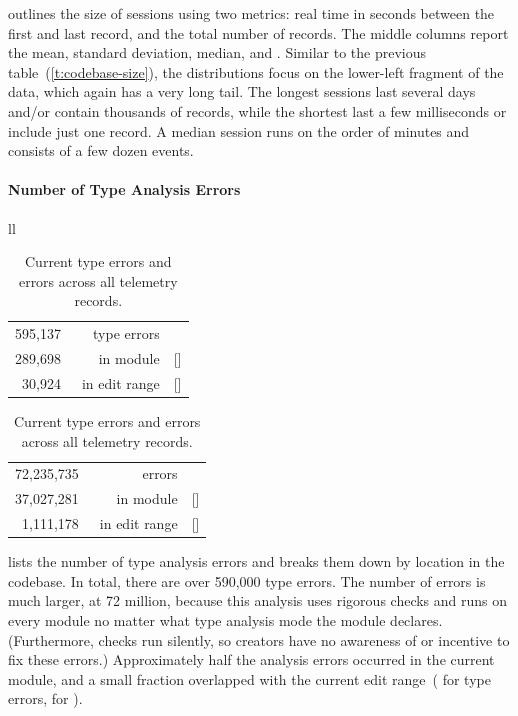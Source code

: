 \documentclass[english,submission,cleveref]{programming}
\begin{document}
 outlines the size of sessions using two metrics:
real time in seconds between the first and last record, and the total number of
records.
The middle columns report the mean, standard deviation,
median, and .
Similar to the previous table~(\cref{t:codebase-size}), the distributions focus
on the lower-left fragment of the data, which again has a very long tail.
The longest sessions last several days and/or contain thousands of records,
while the shortest last a few milliseconds or include just one record.
A median session runs on the order of minutes and consists of a few dozen events.


\paragraph{Number of Type Analysis Errors}
\label{s:count-analysis-errors}

\begin{table}[t]\centering
  \caption{Current type errors and \FS{} errors across all telemetry records.}
  \label{t:count-analysis-errors}
  \begin{tabular}[t]{ll} \\
    \begin{tabular}[t]{r@{~~}r@{~}r}
      595,137 & type errors \\
      289,698 & \hbox{}~in module & [\pct{48.68}] \\
       30,924 & \hbox{}~in edit range & [\pct{5.20}]
    \end{tabular}
    \begin{tabular}[t]{r@{~}r@{~}r}
      72,235,735 & {\FS{} errors} \\
      37,027,281 & \hbox{}~in module & [\pct{51.26}] \\
       1,111,178 & \hbox{}~in edit range & [\pct{1.54}]
    \end{tabular}
  \end{tabular}
\end{table}

 lists the number of type analysis errors
and breaks them down by location in the codebase.
In total, there are over 590,000 type errors.
The number of \FS{} errors is much larger, at 72 million, because this analysis
uses rigorous checks and runs on every module no matter what type analysis
mode the module declares.
(Furthermore, \FS{} checks run silently, so creators have no
awareness of or incentive to fix these errors.)
Approximately half the analysis errors occurred in the current module,
and a small fraction overlapped with the current edit range~( for
type errors,  for \FS{}).
\end{document}
